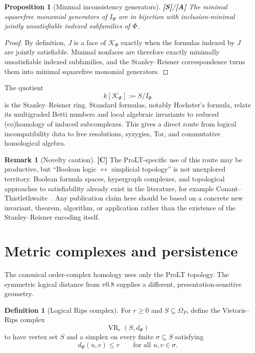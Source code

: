 \documentclass[11pt]{article}
\newtheorem{proposition}[theorem]{Proposition}
\theoremstyle{definition}
\newtheorem{definition}[theorem]{Definition}
\newtheorem{remark}[theorem]{Remark}
\newcommand{\Om}{\Omega_P}
\newcommand{\K}{\mathcal K}
\newcommand{\VR}{\operatorname{VR}}
\newcommand{\statusS}{\textbf{[S]}}
\newcommand{\statusA}{\textbf{[A]}}
\newcommand{\statusC}{\textbf{[C]}}
\begin{document}
\begin{proposition}[Minimal inconsistency generators]\label{prop:SR}
\statusS/\statusA\;
The minimal squarefree monomial generators of $I_\Phi$ are in bijection with inclusion-minimal jointly unsatisfiable indexed subfamilies of $\Phi$.
\end{proposition}

\begin{proof}
By definition, $J$ is a face of $\K_\Phi$ exactly when the formulas indexed by $J$ are jointly satisfiable. Minimal nonfaces are therefore exactly minimally unsatisfiable indexed subfamilies, and the Stanley--Reisner correspondence turns them into minimal squarefree monomial generators.
\end{proof}

The quotient
\[
k[\K_\Phi]:=S/I_\Phi
\]
is the Stanley--Reisner ring. Standard formulas, notably Hochster's formula, relate its multigraded Betti numbers and local algebraic invariants to reduced (co)homology of induced subcomplexes. This gives a direct route from logical incompatibility data to free resolutions, syzygies, Tor, and commutative homological algebra.

\begin{remark}[Novelty caution]
\statusC\; The ProLT-specific use of this route may be productive, but ``Boolean logic $\leftrightarrow$ simplicial topology'' is not unexplored territory. Boolean formula spaces, hypergraph complexes, and topological approaches to satisfiability already exist in the literature, for example Conant--Thistlethwaite~\cite{Conant2010}. Any publication claim here should be based on a concrete new invariant, theorem, algorithm, or application rather than the existence of the Stanley--Reisner encoding itself.
\end{remark}

\section{Metric complexes and persistence}

The canonical order-complex homology uses only the ProLT topology. The symmetric logical distance from v0.8 supplies a different, presentation-sensitive geometry.

\begin{definition}[Logical Rips complex]
For $r\ge0$ and $S\subseteq\Om$, define the Vietoris--Rips complex
\[
\VR_r(S,d_\Phi)
\]
to have vertex set $S$ and a simplex on every finite $\sigma\subseteq S$ satisfying
\[
d_\Phi(u,v)\le r\qquad\text{for all }u,v\in\sigma.
\]
\end{definition}
\end{document}
